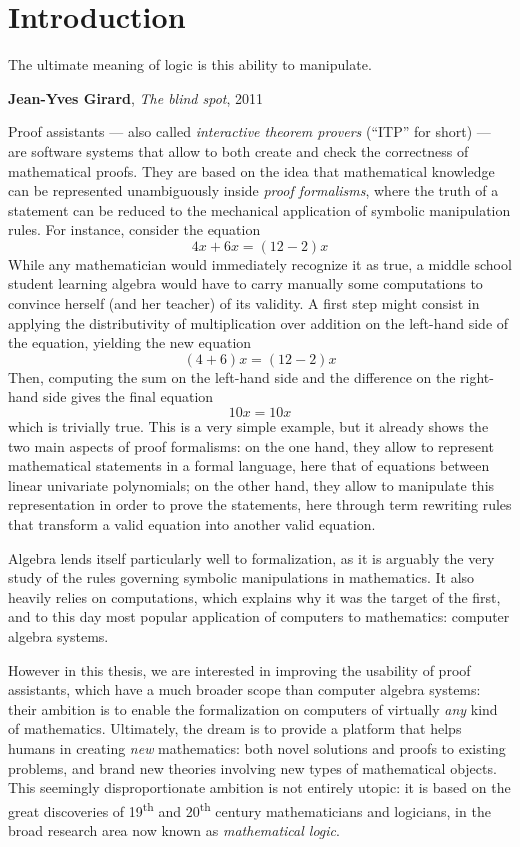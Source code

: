 \setchapterpreamble[u]{\margintoc}
\chapter{Introduction}

\epigraph{The ultimate meaning of logic is this ability to manipulate.}
{\textbf{Jean-Yves Girard}, \textit{The blind spot}, 2011}


Proof assistants --- also called \emph{interactive theorem provers} (``ITP'' for
short) --- are software systems that allow to both create and check the
correctness of mathematical proofs. They are based on the idea that mathematical
knowledge can be represented unambiguously inside \emph{proof formalisms}, where
the truth of a statement can be reduced to the mechanical application of
symbolic manipulation rules. For instance, consider the equation
$$4x + 6x = (12 - 2)x$$ 
While any mathematician would immediately recognize it as true, a middle school
student learning algebra would have to carry manually some computations to
convince herself (and her teacher) of its validity. A first step might consist
in applying the distributivity of multiplication over addition on the left-hand
side of the equation, yielding the new equation
$$(4 + 6)x = (12 - 2)x$$
Then, computing the sum on the left-hand side and the difference on the
right-hand side gives the final equation
$$10x = 10x$$
which is trivially true. This is a very simple example, but it already shows the
two main aspects of proof formalisms: on the one hand, they allow to represent
mathematical statements in a formal language, here that of equations between
linear univariate polynomials; on the other hand, they allow to manipulate
this representation in order to prove the statements, here through term
rewriting rules that transform a valid equation into another valid equation.

Algebra lends itself particularly well to formalization, as it is arguably the
very study of the rules governing symbolic manipulations in mathematics. It also
heavily relies on computations, which explains why it was the target of the
first, and to this day most popular application of computers to mathematics:
computer algebra systems.

However in this thesis, we are interested in improving the usability of proof
assistants, which have a much broader scope than computer algebra systems: their
ambition is to enable the formalization on computers of virtually \emph{any}
kind of mathematics. Ultimately, the dream is to provide a platform that helps
humans in creating \emph{new} mathematics: both novel solutions and proofs to
existing problems, and brand new theories involving new types of mathematical
objects. This seemingly disproportionate ambition is not entirely utopic: it is
based on the great discoveries of 19\textsuperscript{th} and
20\textsuperscript{th} century mathematicians and logicians, in the broad
research area now known as \emph{mathematical logic}.

